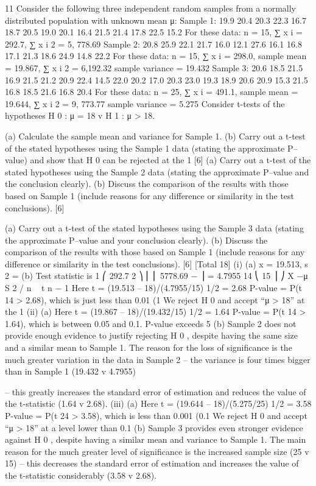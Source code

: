 11
Consider the following three independent random samples from a normally
distributed population with unknown mean μ:
Sample 1:
19.9 20.4 20.3 22.3 16.7 18.7 20.5 19.0 20.1 16.4 21.5 21.4 17.8 22.5 15.2
For these data: n = 15,
∑ x i = 292.7,
∑ x i 2 = 5, 778.69
Sample 2:
20.8 25.9 22.1 21.7 16.0 12.1 27.6 16.1 16.8 17.1 21.3 18.6 24.9 14.8 22.2
For these data: n = 15,
∑ x i = 298.0,
sample mean = 19.867,
∑ x i 2 = 6,192.32
sample variance = 19.432
Sample 3:
20.6 18.5 21.5 16.9 21.5 21.2 20.9 22.4 14.5 22.0 20.2 17.0 20.3 23.0 19.3
18.9 20.6 20.9 15.3 21.5 16.8 18.5 21.6 16.8 20.4
For these data: n = 25, ∑ x i = 491.1,
sample mean = 19.644,
∑ x i 2 = 9, 773.77
sample variance = 5.275
Consider t-tests of the hypotheses H 0 : μ = 18 v H 1 : μ > 18.
\item 
\item 
(a) Calculate the sample mean and variance for Sample 1.
(b) Carry out a t-test of the stated hypotheses using the Sample 1 data
(stating the approximate P–value) and show that H 0 can be rejected at
the 1%
[6]
(a) Carry out a t-test of the stated hypotheses using the Sample 2 data
(stating the approximate P–value and the conclusion clearly).
(b) Discuss the comparison of the results with those based on Sample 1
(include reasons for any difference or similarity in the test
conclusions).
[6]
\item 
(a) Carry out a t-test of the stated hypotheses using the Sample 3 data
(stating the approximate P–value and your conclusion clearly).
(b) Discuss the comparison of the results with those based on Sample 1
(include reasons for any difference or similarity in the test
conclusions).
[6]
[Total 18]
\newpage
{}
(i)
(a) x = 19.513, s 2 =
(b) Test statistic is
1 ⎛
292.7 2 ⎞
⎜ ⎜ 5778.69 −
⎟ = 4.7955
14 ⎝
15 ⎟ ⎠
X −μ
S 2 / n
~ t n − 1
Here t = (19.513 – 18)/(4.7955/15) 1/2 = 2.68
P-value = P(t 14 > 2.68), which is just less than 0.01 (1%
We reject H 0 and accept “μ > 18” at the 1%
(ii)
(a)
Here t = (19.867 – 18)/(19.432/15) 1/2 = 1.64
P-value = P(t 14 > 1.64), which is between 0.05 and 0.1.
P-value exceeds 5%
(b)
Sample 2 does not provide enough evidence to justify rejecting H 0 ,
despite having the same size and a similar mean to Sample 1.
The reason for the loss of significance is the much greater variation in
the data in Sample 2 – the variance is four times bigger than in
Sample 1 (19.432 v 4.7955)

– this greatly increases the standard error of estimation and reduces the
value of the t-statistic (1.64 v 2.68).
(iii)
(a)
Here t = (19.644 – 18)/(5.275/25) 1/2 = 3.58
P-value = P(t 24 > 3.58), which is less than 0.001 (0.1%
We reject H 0 and accept “μ > 18” at a level lower than 0.1%
(b)
Sample 3 provides even stronger evidence against H 0 , despite having a
similar mean and variance to Sample 1.
The main reason for the much greater level of significance is the
increased sample size (25 v 15)
– this decreases the standard error of estimation and increases the value
of the t-statistic considerably (3.58 v 2.68).
